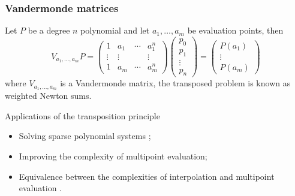 \documentclass[10pt]{beamer}
\renewcommand{\emph}[1]{{\usebeamercolor[fg]{structure}#1}}
\begin{document}
\begin{frame}
  \frametitle{Vandermonde matrices}

  Let $P$ be a degree $n$ polynomial and let $a_1,\ldots,a_m$ be
  evaluation points, then
  \begin{equation*}
    V_{a_1,\ldots,a_m}P =
    \begin{pmatrix}
      1 & a_1 & \cdots & a_1^n\\
      \vdots & \vdots & & \vdots\\
      1 & a_m & \cdots & a_m^n
    \end{pmatrix}
    \begin{pmatrix}
      p_0\\p_1\\\vdots\\p_n
    \end{pmatrix}
    =
    \begin{pmatrix}
      P(a_1)\\\vdots\\P(a_m)
    \end{pmatrix}
  \end{equation*}
  where $V_{a_1,\ldots,a_m}$ is a Vandermonde matrix, the transposed
  problem is known as \emph{weighted Newton sums}.

  \begin{block}{Applications of the transposition principle}
    \begin{itemize}
    \item Solving sparse polynomial systems
      \parencite{canny+kaltofen+yagati89};
    \item Improving the complexity of multipoint evaluation;
    \item Equivalence between the complexities of interpolation and
      multipoint evaluation \parencite{bostan+schost04}.
    \end{itemize}
  \end{block}
\end{frame}

\end{document}

